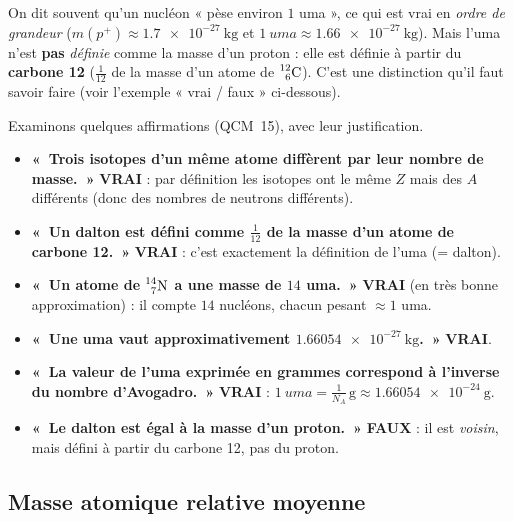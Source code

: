 \documentclass[11pt,a4paper]{article}
\newcommand{\nuc}[3]{\prescript{#1}{#2}{\mathrm{#3}}}  %
\newcommand{\pp}{p^{+}}      %
\begin{document}
\begin{attention}
On dit souvent qu'un nucléon « pèse environ $1$ uma », ce qui est vrai en \emph{ordre de grandeur}
($m(\pp) \approx \SI{1,7e-27}{\kilo\gram}$ et $\SI{1}{uma} \approx \SI{1,66e-27}{\kilo\gram}$). Mais
l'uma n'est \textbf{pas} \emph{définie} comme la masse d'un proton : elle est définie à partir du
\textbf{carbone 12} ($\tfrac{1}{12}$ de la masse d'un atome de $\nuc{12}{6}{C}$). C'est une distinction
qu'il faut savoir faire (voir l'exemple « vrai / faux » ci-dessous).
\end{attention}

\begin{exemple}
Examinons quelques affirmations (QCM~15), avec leur justification.
\begin{itemize}[leftmargin=1.5em,topsep=3pt,itemsep=3pt]
  \item \textbf{«~Trois isotopes d'un même atome diffèrent par leur nombre de masse.~»}
        \;\textbf{\textcolor{excol}{VRAI}} : par définition les isotopes ont le même $Z$ mais des $A$
        différents (donc des nombres de neutrons différents).
  \item \textbf{«~Un dalton est défini comme $\tfrac{1}{12}$ de la masse d'un atome de carbone 12.~»}
        \;\textbf{\textcolor{excol}{VRAI}} : c'est exactement la définition de l'uma (= dalton).
  \item \textbf{«~Un atome de $\nuc{14}{7}{N}$ a une masse de $14$ uma.~»}
        \;\textbf{\textcolor{excol}{VRAI}} (en très bonne approximation) : il compte $14$ nucléons,
        chacun pesant $\approx 1$ uma.
  \item \textbf{«~Une uma vaut approximativement $\SI{1,66054e-27}{\kilo\gram}$.~»}
        \;\textbf{\textcolor{excol}{VRAI}}.
  \item \textbf{«~La valeur de l'uma exprimée en grammes correspond à l'inverse du nombre
        d'Avogadro.~»} \;\textbf{\textcolor{excol}{VRAI}} : $\SI{1}{uma} = \tfrac{1}{N_{\!A}}\,\si{\gram}
        \approx \SI{1,66054e-24}{\gram}$.
  \item \textbf{«~Le dalton est égal à la masse d'un proton.~»}
        \;\textbf{\textcolor{attncol}{FAUX}} : il est \emph{voisin}, mais défini à partir du carbone 12,
        pas du proton.
\end{itemize}
\end{exemple}

\subsection{Masse atomique relative moyenne}
\end{document}
